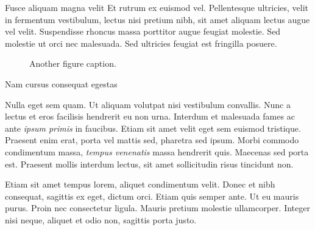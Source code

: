 \documentclass[final]{beamer}
\newlength{\colwidth}
\begin{document}
\begin{frame}[t]
\begin{columns}[t]
\begin{column}{\colwidth}
\begin{block}{Fusce aliquam magna velit}
                Et rutrum ex euismod vel. Pellentesque ultricies, velit in fermentum
                vestibulum, lectus nisi pretium nibh, sit amet aliquam lectus augue vel
                velit. Suspendisse rhoncus massa porttitor augue feugiat molestie. Sed
                molestie ut orci nec malesuada. Sed ultricies feugiat est fringilla
                posuere.

                \begin{figure}
                    \centering
                    \caption{Another figure caption.}
                \end{figure}

            \end{block}

            \begin{block}{Nam cursus consequat egestas}

                Nulla eget sem quam. Ut aliquam volutpat nisi vestibulum convallis. Nunc a
                lectus et eros facilisis hendrerit eu non urna. Interdum et malesuada fames
                ac ante \textit{ipsum primis} in faucibus. Etiam sit amet velit eget sem
                euismod tristique. Praesent enim erat, porta vel mattis sed, pharetra sed
                ipsum. Morbi commodo condimentum massa, \textit{tempus venenatis} massa
                hendrerit quis. Maecenas sed porta est. Praesent mollis interdum lectus,
                sit amet sollicitudin risus tincidunt non.

                Etiam sit amet tempus lorem, aliquet condimentum velit. Donec et nibh
                consequat, sagittis ex eget, dictum orci. Etiam quis semper ante. Ut eu
                mauris purus. Proin nec consectetur ligula. Mauris pretium molestie
                ullamcorper. Integer nisi neque, aliquet et odio non, sagittis porta justo.


\end{block}
\end{column}
\end{columns}
\end{frame}
\end{document}
